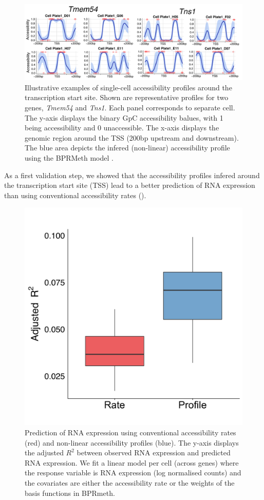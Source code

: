 \begin{figure}[H]
	\centering
	\includegraphics[width=0.9\linewidth]{scNMT_profiles_examples}
	\caption[]{Illustrative examples of single-cell accessibility profiles around the transcription start site. Shown are representative profiles for two genes, \textit{Tmem54} and \textit{Tns1}. Each panel corresponds to separate cell. The y-axis displays the binary GpC accessibility balues, with 1 being accessibility and 0 unaccessible. The x-axis displays the genomic region around the TSS (200bp upstream and downstream). The blue area depicts the infered (non-linear) accessibility profile using the BPRMeth model \cite{Kapourani2018}.}
	\label{fig:scnmt_profiles_examples}
\end{figure}

As a first validation step, we showed that the accessibility profiles infered around the transcription start site (TSS) lead to a better prediction of RNA expression than using conventional accessibility rates ().

\begin{figure}[H]
	\centering
	\includegraphics[width=0.65\linewidth]{scNMT_profiles_prediction}
	\caption[]{Prediction of RNA expression using conventional accessibility rates (red) and non-linear accessibility profiles (blue). The y-axis displays the adjusted $R^2$ between observed RNA expression and predicted RNA expression. We fit a linear model per cell (across genes) where the response variable is RNA expression (log normalised counts) and the covariates are either the accessibility rate or the weights of the basis functions in BPRmeth.}
	\label{fig:scnmt_profiles_prediction}
\end{figure}

